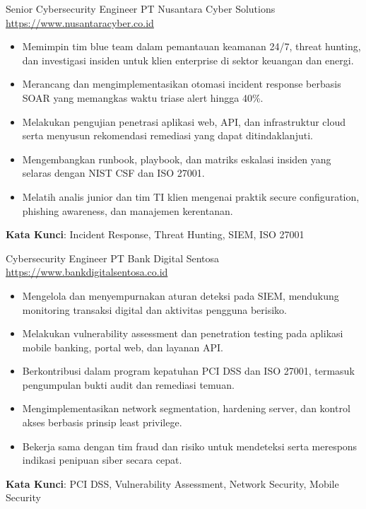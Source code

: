 \documentclass[a4paper, serif, 10pt]{moderncv}
\begin{document}
        {Senior Cybersecurity Engineer}
        {PT Nusantara Cyber Solutions}
        {\url{https://www.nusantaracyber.co.id}}
        {}
        {\begin{itemize}
\item Memimpin tim blue team dalam pemantauan keamanan 24/7, threat hunting, dan investigasi insiden untuk klien enterprise di sektor keuangan dan energi.
\item Merancang dan mengimplementasikan otomasi incident response berbasis SOAR yang memangkas waktu triase alert hingga 40\%.
\item Melakukan pengujian penetrasi aplikasi web, API, dan infrastruktur cloud serta menyusun rekomendasi remediasi yang dapat ditindaklanjuti.
\item Mengembangkan runbook, playbook, dan matriks eskalasi insiden yang selaras dengan NIST CSF dan ISO 27001.
\item Melatih analis junior dan tim TI klien mengenai praktik secure configuration, phishing awareness, dan manajemen kerentanan.
\end{itemize}
\textbf{Kata Kunci}: Incident Response, Threat Hunting, SIEM, ISO 27001}

        {Cybersecurity Engineer}
        {PT Bank Digital Sentosa}
        {\url{https://www.bankdigitalsentosa.co.id}}
        {}
        {\begin{itemize}
\item Mengelola dan menyempurnakan aturan deteksi pada SIEM, mendukung monitoring transaksi digital dan aktivitas pengguna berisiko.
\item Melakukan vulnerability assessment dan penetration testing pada aplikasi mobile banking, portal web, dan layanan API.
\item Berkontribusi dalam program kepatuhan PCI DSS dan ISO 27001, termasuk pengumpulan bukti audit dan remediasi temuan.
\item Mengimplementasikan network segmentation, hardening server, dan kontrol akses berbasis prinsip least privilege.
\item Bekerja sama dengan tim fraud dan risiko untuk mendeteksi serta merespons indikasi penipuan siber secara cepat.
\end{itemize}
\textbf{Kata Kunci}: PCI DSS, Vulnerability Assessment, Network Security, Mobile Security}
\end{document}
